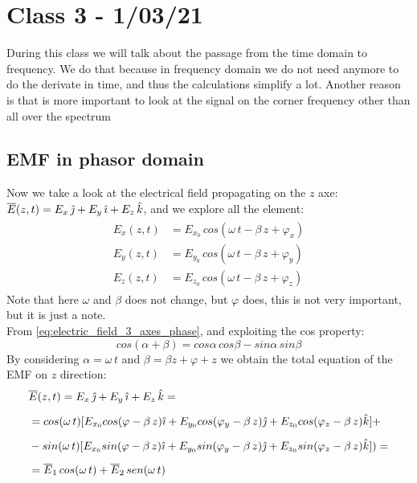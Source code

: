 \section{Class 3 - 1/03/21}
During this class we will talk about the passage from the time domain to frequency. We do that because in frequency domain we do not need anymore to do the derivate in time, and thus the calculations simplify a lot. Another reason is that is more important to look at the signal on the corner frequency other than all over the spectrum
\subsection*{EMF in phasor domain}
Now we take a look at the electrical field propagating on the $z$ axe: $\overline{E}(z,t)=E_x\,\hat{\jmath}+E_y\,\hat{\imath}+E_z\,\hat{\mathnormal{k}}$, and we explore all the element:
\begin{align}\label{eq:electric_field_3_axes_phase}
    \begin{split}
        E_x(z,t)&=E_{x_0}\,cos(\omega\,t-\beta\,z+\varphi_x)\\[5pt]
        E_y(z,t)&=E_{y_0}\,cos(\omega\,t-\beta\,z+\varphi_y)\\[5pt]
        E_z(z,t)&=E_{z_0}\,cos(\omega\,t-\beta\,z+\varphi_z)
    \end{split}
\end{align}
Note that here $\omega$ and $\beta$ does not change, but $\varphi$ does, this is not very important, but it is just a note.\\
From \cref{eq:electric_field_3_axes_phase}, and exploiting the cos property:
\begin{equation*}
    cos(\alpha + \beta )=cos\alpha\, cos\beta - sin\alpha \, sin\beta
\end{equation*}
By considering $\alpha = \omega\, t$ and $\beta = \beta z+\varphi+z$ we obtain the total equation of the EMF on $z$ direction:
\begin{align}
    \begin{split}
        &\overline{E}(z,t)=E_x\,\hat{\jmath}+E_y\,\hat{\imath}+E_z\,\hat{\mathnormal{k}}=\\[5pt]
        &=cos(\omega\,t)[E_{x_0}cos(\varphi-\beta\,z)\hat{\imath}+E_{y_0}cos(\varphi_y-\beta\,z)\hat{\jmath}+E_{z_0}cos(\varphi_z-\beta\,z)\hat{\mathnormal{k}}]+\\[5pt]
        &-sin(\omega\,t)[E_{x_0}sin(\varphi-\beta\,z)\hat{\imath}+E_{y_0}sin(\varphi_y-\beta\,z)\hat{\jmath}+E_{z_0}sin(\varphi_z-\beta\,z)\hat{\mathnormal{k}}])=\\[5pt]
        &=\overline{E}_1\,cos(\omega\,t)+\overline{E}_2\,sen(\omega\,t)
    \end{split}
\end{align}
